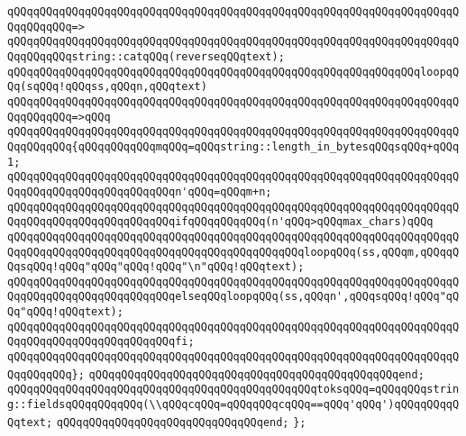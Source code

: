 \verb|qQQqqQQqqQQqqQQqqQQqqQQqqQQqqQQqqQQqqQQqqQQqqQQqqQQqqQQqqQQqqQQqqQQqqQQqqQQqqQQq=>|\newline
\verb|qQQqqQQqqQQqqQQqqQQqqQQqqQQqqQQqqQQqqQQqqQQqqQQqqQQqqQQqqQQqqQQqqQQqqQQqqQQqqQQqstring::catqQQq(reverseqQQqtext);|\newline
\newline
\verb|qQQqqQQqqQQqqQQqqQQqqQQqqQQqqQQqqQQqqQQqqQQqqQQqqQQqqQQqqQQqqQQqloopqQQq(sqQQq!qQQqss,qQQqn,qQQqtext)|\newline
\verb|qQQqqQQqqQQqqQQqqQQqqQQqqQQqqQQqqQQqqQQqqQQqqQQqqQQqqQQqqQQqqQQqqQQqqQQqqQQqqQQq=>qQQq|\newline
\verb|qQQqqQQqqQQqqQQqqQQqqQQqqQQqqQQqqQQqqQQqqQQqqQQqqQQqqQQqqQQqqQQqqQQqqQQqqQQqqQQq{qQQqqQQqqQQqmqQQq=qQQqstring::length_in_bytesqQQqsqQQq+qQQq1;|\newline
\verb|qQQqqQQqqQQqqQQqqQQqqQQqqQQqqQQqqQQqqQQqqQQqqQQqqQQqqQQqqQQqqQQqqQQqqQQqqQQqqQQqqQQqqQQqqQQqqQQqn'qQQq=qQQqm+n;|\newline
\newline
\verb|qQQqqQQqqQQqqQQqqQQqqQQqqQQqqQQqqQQqqQQqqQQqqQQqqQQqqQQqqQQqqQQqqQQqqQQqqQQqqQQqqQQqqQQqqQQqqQQqifqQQqqQQqqQQq(n'qQQq>qQQqmax_chars)qQQq|\newline
\verb|qQQqqQQqqQQqqQQqqQQqqQQqqQQqqQQqqQQqqQQqqQQqqQQqqQQqqQQqqQQqqQQqqQQqqQQqqQQqqQQqqQQqqQQqqQQqqQQqqQQqqQQqqQQqqQQqqQQqloopqQQq(ss,qQQqm,qQQqqQQqsqQQq!qQQq"qQQq"qQQq!qQQq"\n"qQQq!qQQqtext);|\newline
\verb|qQQqqQQqqQQqqQQqqQQqqQQqqQQqqQQqqQQqqQQqqQQqqQQqqQQqqQQqqQQqqQQqqQQqqQQqqQQqqQQqqQQqqQQqqQQqqQQqelseqQQqloopqQQq(ss,qQQqn',qQQqsqQQq!qQQq"qQQq"qQQq!qQQqtext);|\newline
\verb|qQQqqQQqqQQqqQQqqQQqqQQqqQQqqQQqqQQqqQQqqQQqqQQqqQQqqQQqqQQqqQQqqQQqqQQqqQQqqQQqqQQqqQQqqQQqqQQqfi;|\newline
\verb|qQQqqQQqqQQqqQQqqQQqqQQqqQQqqQQqqQQqqQQqqQQqqQQqqQQqqQQqqQQqqQQqqQQqqQQqqQQqqQQq};|\newline
\verb|qQQqqQQqqQQqqQQqqQQqqQQqqQQqqQQqqQQqqQQqqQQqqQQqend;|\newline
\newline
\verb|qQQqqQQqqQQqqQQqqQQqqQQqqQQqqQQqqQQqqQQqqQQqqQQqtoksqQQq=qQQqqQQqstring::fieldsqQQqqQQqqQQq(\\qQQqcqQQq=qQQqqQQqcqQQq==qQQq'qQQq')qQQqqQQqqQQqtext;|\newline
\verb|qQQqqQQqqQQqqQQqqQQqqQQqqQQqqQQqend;|\newline
\verb|};|\newline

